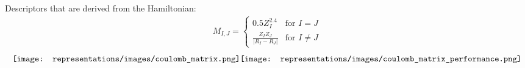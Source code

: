 Descriptors that are derived from the Hamiltonian:
\begin{align*}
M_{I,J} = 
\begin{cases}
0.5Z_{I}^{2.4}& \text{for } I = J \\
\frac{Z_{I}Z_{J}}{|R_I-R_J|}&  \text{for } I \neq J
\end{cases}
\end{align*}
\begin{align*}
\hspace*{\fill}%
{\texttt{[image: representations/images/coulomb\_matrix.png]}\hspace*{\fill}}%
{\texttt{[image: representations/images/coulomb\_matrix\_performance.png]}}%
\hspace*{\fill}%
\end{align*}
